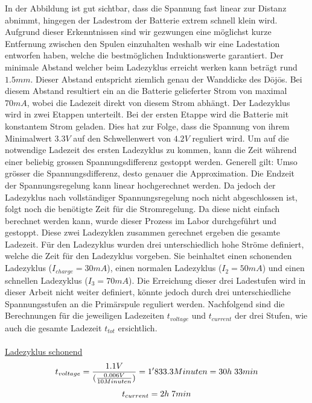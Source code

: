 In der Abbildung ist gut sichtbar, dass die Spannung fast linear zur Distanz abnimmt, hingegen der Ladestrom der Batterie extrem schnell klein wird. Aufgrund dieser Erkenntnissen sind wir gezwungen eine möglichst kurze Entfernung zwischen den Spulen einzuhalten weshalb wir eine Ladestation entworfen haben, welche die bestmöglichen Induktionswerte garantiert. Der minimale Abstand welcher beim Ladezyklus erreicht werken kann beträgt rund $1.5mm$. Dieser Abstand entspricht ziemlich genau der Wanddicke des Dōjōs. Bei diesem Abstand resultiert ein an die Batterie gelieferter Strom von maximal $70mA$, wobei die Ladezeit direkt von diesem Strom abhängt. Der Ladezyklus wird in zwei Etappen unterteilt. Bei der ersten Etappe wird die Batterie mit konstantem Strom geladen. Dies hat zur Folge, dass die Spannung von ihrem Minimalwert $3.3V$ auf den Schwellenwert von $4.2V$ reguliert wird. Um auf die notwendige Ladezeit des ersten Ladezyklus zu kommen, kann die Zeit während einer beliebig grossen Spannungsdifferenz gestoppt werden. Generell gilt: Umso grösser die Spannungsdifferenz, desto genauer die Approximation. Die Endzeit der Spannungsregelung kann linear hochgerechnet werden. Da jedoch der Ladezyklus nach vollständiger Spannungsregelung noch nicht abgeschlossen ist, folgt noch die benötigte Zeit für die Stromregelung. Da diese nicht einfach berechnet werden kann, wurde dieser Prozess im Labor durchgeführt und gestoppt. Diese zwei Ladezyklen zusammen gerechnet ergeben die gesamte Ladezeit. Für den Ladezyklus wurden drei unterschiedlich hohe Ströme definiert, welche die Zeit für den Ladezyklus vorgeben. Sie beinhaltet einen schonenden Ladezyklus ($I_{charge}=30mA$), einen normalen Ladezyklus ($I_{2}=50mA$) und einen schnellen Ladezyklus ($I_{3}=70mA$). Die Erreichung dieser drei Ladestufen wird in dieser Arbeit nicht weiter definiert, könnte jedoch durch drei unterschiedliche Spannungsstufen an die Primärspule reguliert werden. Nachfolgend sind die Berechnungen für die jeweiligen Ladezeiten $t_{voltage}$ und $t_{current}$ der drei Stufen, wie auch die gesamte Ladezeit $t_{tot}$ ersichtlich.
\\
\\

\underline{Ladezyklus schonend}
\begin{equation}
\centering
t_{voltage}=\frac{1.1 V}{(\frac{0.006 V}{10 Minuten})}=1'833.3 Minuten= 30h\thickspace 33min
\label{eq:SchonendSpannung}
\end{equation}
\begin{equation}
\centering
t_{current}= 2h\thickspace 7min
\label{eq:SchonendStrom}
\end{equation}

